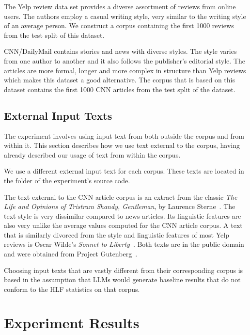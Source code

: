 \documentclass[11pt]{article}
\begin{document}
The Yelp review data set provides a diverse assortment of reviews from online
users.
The authors employ a casual writing style, very similar to the writing style of
an average person.
We construct a corpus containing the first 1000 reviews from the test split of
this dataset.

CNN/DailyMail contains stories and news with diverse styles.
The style varies from one author to another and it also follows the publisher's
editorial style.
The articles are more formal, longer and more complex in structure than Yelp
reviews which makes this dataset a good alternative.
The corpus that is based on this dataset contains the first 1000 CNN articles
from the test split of the dataset.

\subsection{External Input Texts}\label{input-text}

The experiment involves using input text from both outside the corpus and from
within it.
This section describes how we use text external to the corpus, having already
described our usage of text from within the corpus.

We use a different external input text for each corpus.
These texts are located in the
\texttt{}
folder of the experiment's source code.

The text external to the CNN article corpus is an extract from the classic
\textit{The Life and Opinions of Tristram Shandy, Gentleman}, by Laurence
Sterne~\cite{sterne2003life}.
The text style is very dissimilar compared to news articles.
Its linguistic features are also very unlike the average values computed for the
CNN article corpus.
A text that is similarly divorced from the style and linguistic features of most
Yelp reviews is Oscar Wilde's \textit{Sonnet to Liberty}~\cite{wilde1909poems}.
Both texts are in the public domain and were obtained from Project
Gutenberg~\cite{gutenberg}.

Choosing input texts that are vastly different from their corresponding corpus
is based in the assumption that LLMs would generate baseline results that do not
conform to the HLF statistics on that corpus.

\section{Experiment Results}
\end{document}
